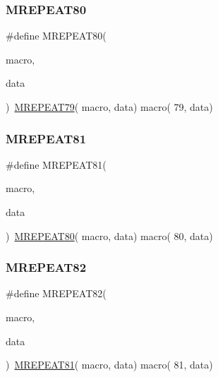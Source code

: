 \mbox{\label{group__group__sam0__utils__mrepeat_ga4e1ab69f4a649fc9f759f19ddf0150bd}} 
\subsubsection{\texorpdfstring{MREPEAT80}{MREPEAT80}}
{\footnotesize\ttfamily \#define M\+R\+E\+P\+E\+A\+T80(\begin{DoxyParamCaption}\item[{}]{macro,  }\item[{}]{data }\end{DoxyParamCaption})~\mbox{\hyperlink{group__group__sam0__utils__mrepeat_ga8ca389624ac706853a8b95daa9b60074}{M\+R\+E\+P\+E\+A\+T79}}( macro, data)   macro( 79, data)}

\mbox{\label{group__group__sam0__utils__mrepeat_ga20dda5110c7ee8595742b7493a50fa84}} 
\subsubsection{\texorpdfstring{MREPEAT81}{MREPEAT81}}
{\footnotesize\ttfamily \#define M\+R\+E\+P\+E\+A\+T81(\begin{DoxyParamCaption}\item[{}]{macro,  }\item[{}]{data }\end{DoxyParamCaption})~\mbox{\hyperlink{group__group__sam0__utils__mrepeat_ga4e1ab69f4a649fc9f759f19ddf0150bd}{M\+R\+E\+P\+E\+A\+T80}}( macro, data)   macro( 80, data)}

\mbox{\label{group__group__sam0__utils__mrepeat_gab614d1a44b41de1264618e26d1f457c6}} 
\subsubsection{\texorpdfstring{MREPEAT82}{MREPEAT82}}
{\footnotesize\ttfamily \#define M\+R\+E\+P\+E\+A\+T82(\begin{DoxyParamCaption}\item[{}]{macro,  }\item[{}]{data }\end{DoxyParamCaption})~\mbox{\hyperlink{group__group__sam0__utils__mrepeat_ga20dda5110c7ee8595742b7493a50fa84}{M\+R\+E\+P\+E\+A\+T81}}( macro, data)   macro( 81, data)}

